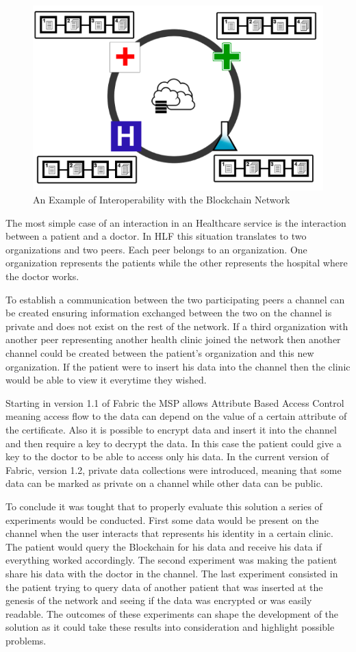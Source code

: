 \begin{figure}[ht] \centering
\includegraphics[width=0.7\linewidth]{imgs/interoperability.png}
\caption{\label{fig:interoperability}An Example of Interoperability with the
Blockchain Network} \end{figure}

The most simple case of an interaction in an Healthcare service is the
interaction between a patient and a doctor. In HLF this situation translates to
two organizations and two peers. Each peer belongs to an organization. One
organization represents the patients while the other represents the hospital
where the doctor works. 

To establish a communication between the two participating peers a channel can
be created ensuring information exchanged between the two on the channel is
private and does not exist on the rest of the network.  If a third organization
with another peer representing another health clinic joined the network then
another channel could be created between the patient's organization and this
new organization. If the patient were to insert his data into the channel then
the clinic would be able to view it everytime they wished. 

Starting in version 1.1 of Fabric the MSP allows Attribute Based Access Control
meaning access flow to the data can depend on the value of a certain attribute
of the certificate. Also it is possible to encrypt data and insert it into the
channel and then require a key to decrypt the data. In this case the patient
could give a key to the doctor to be able to access only his data. In the
current version of Fabric, version 1.2, private data collections were
introduced, meaning that some data can be marked as private on a channel while
other data can be public.

To conclude it was tought that to properly evaluate this solution a series of
experiments would be conducted. First some data would be present on the channel
when the user interacts that represents his identity in a certain clinic. The
patient would query the Blockchain for his data and receive his data if
everything worked accordingly. The second experiment was making the patient
share his data with the doctor in the channel. The last experiment consisted in
the patient trying to query data of another patient that was inserted at the
genesis of the network and seeing if the data was encrypted or was easily
readable. The outcomes of these experiments can shape the development of the
solution as it could take these results into consideration and highlight
possible problems.


